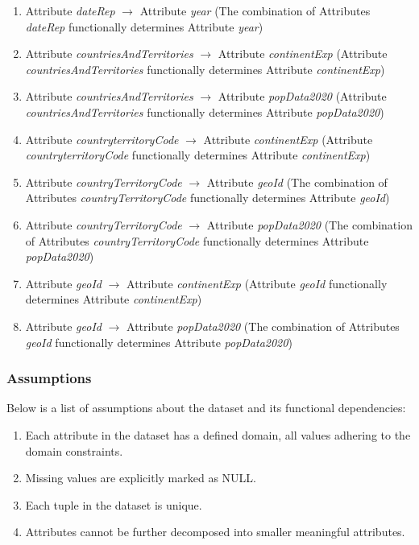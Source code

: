 \documentclass[]{article}
\begin{document}
\begin{enumerate}[label=\textbf{FD\arabic*.}]
    \item Attribute \textit{dateRep} $\rightarrow$ Attribute \textit{year} (The combination of Attributes \textit{dateRep} functionally determines Attribute \textit{year})
    \item Attribute \textit{countriesAndTerritories} $\rightarrow$ Attribute \textit{continentExp} (Attribute \textit{countriesAndTerritories} functionally determines Attribute \textit{continentExp})
    \item Attribute \textit{countriesAndTerritories} $\rightarrow$ Attribute \textit{popData2020} (Attribute \textit{countriesAndTerritories} functionally determines Attribute \textit{popData2020})
    \item Attribute \textit{countryterritoryCode} $\rightarrow$ Attribute \textit{continentExp} (Attribute \textit{countryterritoryCode} functionally determines Attribute \textit{continentExp})
    \item Attribute \textit{countryTerritoryCode} $\rightarrow$ Attribute \textit{geoId} (The combination of Attributes \textit{countryTerritoryCode} functionally determines Attribute \textit{geoId})
    \item Attribute \textit{countryTerritoryCode} $\rightarrow$ Attribute \textit{popData2020} (The combination of Attributes \textit{countryTerritoryCode} functionally determines Attribute \textit{popData2020})
    \item Attribute \textit{geoId} $\rightarrow$ Attribute \textit{continentExp} (Attribute \textit{geoId} functionally determines Attribute \textit{continentExp})
    \item Attribute \textit{geoId} $\rightarrow$ Attribute \textit{popData2020} (The combination of Attributes \textit{geoId} functionally determines Attribute \textit{popData2020})
\end{enumerate}

\subsubsection{Assumptions}
Below is a list of assumptions about the dataset and its functional dependencies:
\begin{enumerate}[label=\textbf{A\arabic*.}]
    \item Each attribute in the dataset has a defined domain, all values adhering to the domain constraints.
    \item Missing values are explicitly marked as NULL.
    \item Each tuple in the dataset is unique.
    \item Attributes cannot be further decomposed into smaller meaningful attributes.
\end{enumerate}
\end{document}
